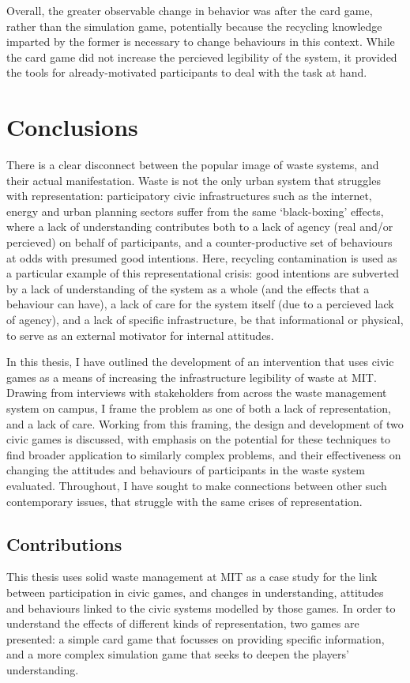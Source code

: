 \documentclass[nofonts,nols,justified,nobib]{tufte-book}
\begin{document}
Overall, the greater observable change in behavior was after the card game, rather than the simulation game, potentially because the recycling knowledge imparted by the former is necessary to change behaviours in this context. While the card game did not increase the percieved legibility of the system, it provided the tools for already-motivated participants to deal with the task at hand. 


\chapter*{Conclusions}

There is a clear disconnect between the popular image of waste systems, and their actual manifestation. Waste is not the only urban system that struggles with representation: participatory civic infrastructures such as the internet, energy \cite{onuoha_i_2016} and urban planning sectors suffer from the same `black-boxing' effects, where a lack of understanding contributes both to a lack of agency (real and/or percieved) on behalf of participants, and a counter-productive set of behaviours at odds with presumed good intentions. Here, recycling contamination is used as a particular example of this representational crisis: good intentions are subverted by a lack of understanding of the system as a whole (and the effects that a behaviour can have), a lack of care for the system itself (due to a percieved lack of agency), and a lack of specific infrastructure, be that informational or physical, to serve as an external motivator for internal attitudes.

In this thesis, I have outlined the development of an intervention that uses civic games as a means of increasing the infrastructure legibility of waste at MIT. Drawing from interviews with stakeholders from across the waste management system on campus, I frame the problem as one of both a lack of representation, and a lack of care. Working from this framing, the design and development of two civic games is discussed, with emphasis on the potential for these techniques to find broader application to similarly complex problems, and their effectiveness on changing the attitudes and behaviours of participants in the waste system evaluated. Throughout, I have sought to make connections between other such contemporary issues, that struggle with the same crises of representation.

\newpage

\section*{Contributions}
This thesis uses solid waste management at MIT as a case study for the link between participation in civic games, and changes in understanding, attitudes and behaviours linked to the civic systems modelled by those games. In order to understand the effects of different kinds of representation, two games are presented: a simple card game that focusses on providing specific information, and a more complex simulation game that seeks to deepen the players' understanding.
\end{document}
